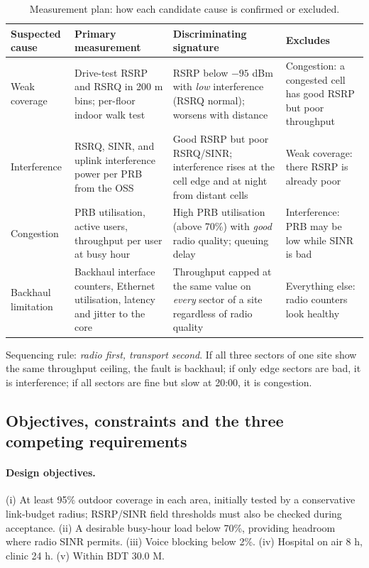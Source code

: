\documentclass[9pt,a4paper]{extarticle}
\begin{document}
\begin{table}[H]\centering\small
\caption{Measurement plan: how each candidate cause is confirmed or excluded.}
\label{tab:diag}
\begin{tabularx}{\textwidth}{@{}p{2.35cm}p{3.6cm}Xp{3.35cm}@{}}
\toprule
\textbf{Suspected cause} & \textbf{Primary measurement} & \textbf{Discriminating signature} & \textbf{Excludes} \\
\midrule
Weak coverage & Drive-test RSRP and RSRQ in 200 m bins; per-floor indoor walk test & RSRP below $-95$ dBm with \emph{low} interference (RSRQ normal); worsens with distance & Congestion: a congested cell has good RSRP but poor throughput \\
Interference & RSRQ, SINR, and uplink interference power per PRB from the OSS & Good RSRP but poor RSRQ/SINR; interference rises at the cell edge and at night from distant cells & Weak coverage: there RSRP is already poor \\
Congestion & PRB utilisation, active users, throughput per user at busy hour & High PRB utilisation (above 70\%) with \emph{good} radio quality; queuing delay & Interference: PRB may be low while SINR is bad \\
Backhaul limitation & Backhaul interface counters, Ethernet utilisation, latency and jitter to the core & Throughput capped at the same value on \emph{every} sector of a site regardless of radio quality & Everything else: radio counters look healthy \\
\bottomrule
\end{tabularx}
\end{table}

Sequencing rule: \emph{radio first, transport second}. If all three sectors of one site show
the same throughput ceiling, the fault is backhaul; if only edge sectors are bad, it is
interference; if all sectors are fine but slow at 20:00, it is congestion.

\subsection{Objectives, constraints and the three competing requirements}
\paragraph{Design objectives.} (i) At least 95\% outdoor coverage in each area, initially tested by a conservative link-budget radius;
RSRP/SINR field thresholds must also be checked during acceptance. (ii) A desirable busy-hour load below 70\%, providing headroom where radio SINR permits. (iii) Voice blocking
below 2\%. (iv) Hospital on air 8 h, clinic 24 h. (v) Within BDT 30.0 M.
\end{document}
